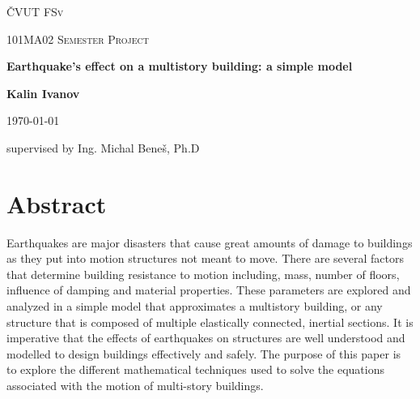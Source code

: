 \documentclass{article}
\begin{document}
\begin{titlepage}
	\centering
	{\scshape\LARGE \v{C}VUT FSv  \par}
	\vspace{1cm}
	{\scshape\Large 101MA02 Semester Project\par}
	\vspace{1.5cm}
	{\huge\bfseries Earthquake's effect on a multistory building: a simple model\par}
	\vspace{2cm}
	{\Large\textbf{Kalin Ivanov}\par}
	\vspace{2cm}
	{\large \today\par}
	\vfill
	{\Large supervised by Ing. Michal Bene\v{s}, Ph.D\par}
	

	
\end{titlepage}


	\newpage
	\tableofcontents
	
	\newpage

	
	\section{Abstract}

Earthquakes are major disasters that cause great amounts of damage to buildings as they put into motion structures not meant to move. There are several factors that determine building resistance to motion including, mass, number of floors, influence of damping and material properties. These parameters are explored and analyzed in a simple model that approximates a multistory building, or any structure that is composed of multiple elastically connected, inertial sections. It is imperative that the effects of earthquakes on structures are well understood and modelled to design buildings effectively and safely. The purpose of this paper is to explore the different mathematical techniques used to solve the equations associated with the motion of multi-story buildings. 
\end{document}
